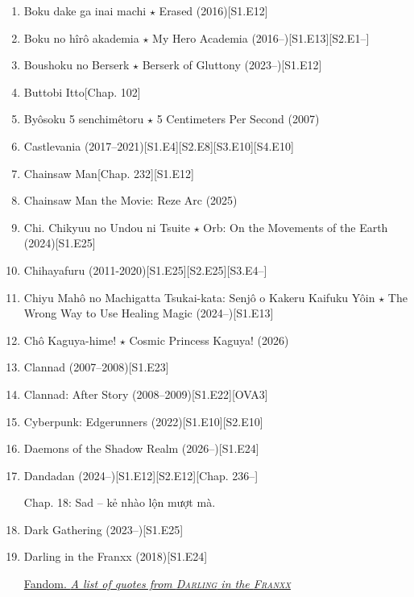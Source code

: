 \documentclass{article}
\begin{document}
\begin{enumerate}
\begin{itemize}
    \end{itemize}
    \item {\sc Boku dake ga inai machi $\star$ Erased} (2016)\hfill[S1.E12]
    \item Boku no hîrô akademia $\star$ My Hero Academia (2016--)\hfill[S1.E13][S2.E1--]
    \item {\sc Boushoku no Berserk $\star$ Berserk of Gluttony} (2023--)\hfill[S1.E12]
    \item {\sc Buttobi Itto}\hfill[Chap. 102]
    \item {\sc By\^osoku 5 senchimêtoru $\star$ 5 Centimeters Per Second} (2007)
    \item {\sc Castlevania} (2017--2021)\hfill[S1.E4][S2.E8][S3.E10][S4.E10]
    \item {\sc Chainsaw Man}\hfill[Chap. 232][S1.E12]
    \item {\sc Chainsaw Man the Movie: Reze Arc} (2025)
    \item {\sc Chi. Chikyuu no Undou ni Tsuite $\star$ Orb: On the Movements of the Earth} (2024)\hfill[S1.E25]
    \item Chihayafuru (2011-2020)\hfill[S1.E25][S2.E25][S3.E4--]
    \item {\sc Chiyu Mahô no Machigatta Tsukai-kata: Senjô o Kakeru Kaifuku Yôin $\star$ The Wrong Way to Use Healing Magic} (2024--)[S1.E13]
    \item {\sc Chô Kaguya-hime! $\star$ Cosmic Princess Kaguya!} (2026)
    \item {\sc Clannad} (2007--2008)\hfill[S1.E23]
    \item {\sc Clannad: After Story} (2008--2009)\hfill[S1.E22][OVA3]
    \item {\sc Cyberpunk: Edgerunners} (2022)\hfill[S1.E10][S2.E10]
    \item {\sc Daemons of the Shadow Realm} (2026--)\hfill[S1.E24]
    \item {\sc Dandadan} (2024--)\hfill[S1.E12][S2.E12][Chap. 236--]

    Chap. 18: Sad -- kẻ nhào lộn mượt mà.
    \item {\sc Dark Gathering} (2023--)\hfill[S1.E25]
    \item {\sc Darling in the Franxx} (2018)\hfill[S1.E24]

    \href{https://darling-in-the-franxx.fandom.com/wiki/List_of_Quotes}{Fandom. {\it A list of quotes from \textsc{Darling} in the \textsc{Franxx}}}


\end{enumerate}
\end{document}
